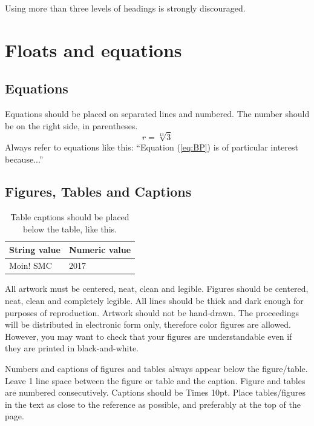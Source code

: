 \documentclass{article}
\begin{document}
Using more than three levels of headings is strongly discouraged.





\section{Floats and equations}

\subsection{Equations}
Equations should be placed on separated lines and numbered. The number should be on the right side, in parentheses.
\begin{equation}
r=\sqrt[13]{3}
\label{eq:BP}
\end{equation}
Always refer to equations like this: ``Equation (\ref{eq:BP}) is of particular interest because...''

\subsection{Figures, Tables and Captions}
\begin{table}[t]
 \begin{center}
 \begin{tabular}{|l|l|}
  \hline
  String value & Numeric value \\
  \hline
  Moin! SMC & 2017 \\
  \hline
 \end{tabular}
\end{center}
 \caption{Table captions should be placed below the table,  like this.}
 \label{tab:example}
\end{table}

All artwork must be centered, neat, clean and legible. Figures should be centered, neat, clean
and completely legible. All lines should be thick and dark enough for purposes of reproduction. Artwork should not be hand-drawn. The proceedings will be distributed in electronic form only, therefore color figures are allowed. However, you may want to check that your figures are understandable even if they are printed in black-and-white.


Numbers and captions of figures and tables always appear below the figure/table.
Leave 1 line space between the figure or table and the caption.
Figure and tables are numbered consecutively. 
Captions should be Times 10pt. Place tables/figures in the text as close to the reference as possible, 
and preferably at the top of the page.
\end{document}
